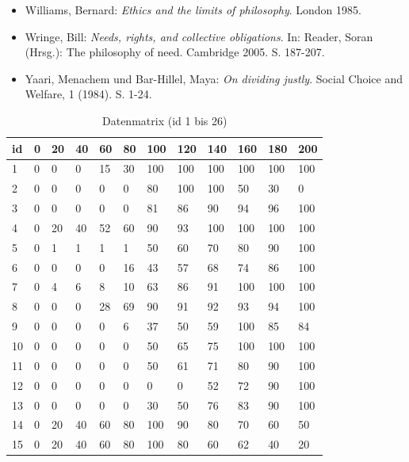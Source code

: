 \documentclass[a4paper]{thesis}
\begin{document}
\begin{itemize}[leftmargin=1.5em,label={},itemindent=-1.5em, itemsep=-1ex]
\item Williams, Bernard: \textit{Ethics and the limits of philosophy}. London 1985.

\item Wringe, Bill: \textit{Needs, rights, and collective obligations}. In: Reader, Soran (Hrsg.): The philosophy of need. Cambridge 2005. S. 187-207.

\item Yaari, Menachem und Bar-Hillel, Maya: \textit{On dividing justly}. Social Choice and Welfare, 1 (1984). S. 1-24.
\end{itemize}

\Tabellenverzeichnis
 
\Abbildungsverzeichnis


\begin{table}[H]
\centering
\caption{Datenmatrix (id 1 bis 26)}
\begin{tabular}{l|lllllllllll}
id & 0 & 20 & 40 & 60 & 80 & 100 & 120 & 140 & 160 & 180 & 200\\
\hline
1 & 0 & 0 & 0 & 15 & 30 & 100 & 100 & 100 & 100 & 100 & 100 \\
2 & 0 & 0 & 0 & 0 & 0 & 80 & 100 & 100 & 50 & 30 & 0 \\
3 & 0 & 0 & 0 & 0 & 0 & 81 & 86 & 90 & 94 & 96 & 100 \\
4 & 0 & 20 & 40 & 52 & 60 & 90 & 93 & 100 & 100 & 100 & 100 \\
5 & 0 & 1 & 1 & 1 & 1 & 50 & 60 & 70 & 80 & 90 & 100 \\
6 & 0 & 0 & 0 & 0 & 16 & 43 & 57 & 68 & 74 & 86 & 100 \\
7 & 0 & 4 & 6 & 8 & 10 & 63 & 86 & 91 & 100 & 100 & 100 \\
8 & 0 & 0 & 0 & 28 & 69 & 90 & 91 & 92 & 93 & 94 & 100 \\
9 & 0 & 0 & 0 & 0 & 6 & 37 & 50 & 59 & 100 & 85 & 84 \\
10 & 0 & 0 & 0 & 0 & 0 & 50 & 65 & 75 & 100 & 100 & 100 \\
11 & 0 & 0 & 0 & 0 & 0 & 50 & 61 & 71 & 80 & 90 & 100 \\
12 & 0 & 0 & 0 & 0 & 0 & 0 & 0 & 52 & 72 & 90 & 100 \\
13 & 0 & 0 & 0 & 0 & 0 & 30 & 50 & 76 & 83 & 90 & 100 \\
14 & 0 & 20 & 40 & 60 & 80 & 100 & 90 & 80 & 70 & 60 & 50 \\
15 & 0 & 20 & 40 & 60 & 80 & 100 & 80 & 60 & 62 & 40 & 20 \\

\end{tabular}
\end{table}
\end{document}
